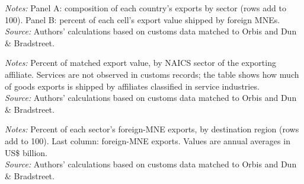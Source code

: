 \documentclass[11pt,a4paper]{article}
\begin{document}
\begin{table}[H]\centering\small%
  \caption{Exports by Exporting Country and Sector}%
  \label{tab:ox_t}%
  \par\vspace{3pt}%
  \begin{minipage}{0.95\textwidth}\footnotesize %
  \textit{Notes:} Panel A: composition of each country's exports by sector (rows add to 100). Panel B: percent of each cell's export value shipped by foreign MNEs.\\[3pt]%
  \textit{Source:} Authors' calculations based on customs data matched to Orbis and Dun \& Bradstreet.%
  \end{minipage}%
  \end{table}
\begin{table}[H]\centering\small%
  \caption{Industry of Matched Exporting Affiliates}%
  \label{tab:services}%
  \par\vspace{3pt}%
  \begin{minipage}{0.95\textwidth}\footnotesize %
  \textit{Notes:} Percent of matched export value, by NAICS sector of the exporting affiliate. Services are not observed in customs records; the table shows how much of goods exports is shipped by affiliates classified in service industries.\\[3pt]%
  \textit{Source:} Authors' calculations based on customs data matched to Orbis and Dun \& Bradstreet.%
  \end{minipage}%
  \end{table}
\begin{table}[H]\centering\small%
  \caption{Foreign-Multinational Exports by Sector and Destination Region}%
  \label{tab:sdr}%
  \par\vspace{3pt}%
  \begin{minipage}{0.95\textwidth}\footnotesize %
  \textit{Notes:} Percent of each sector's foreign-MNE exports, by destination region (rows add to 100). Last column: foreign-MNE exports. Values are annual averages in US\$ billion.\\[3pt]%
  \textit{Source:} Authors' calculations based on customs data matched to Orbis and Dun \& Bradstreet.%
  \end{minipage}%
  \end{table}
\end{document}
